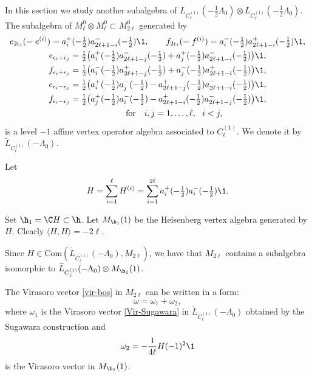 \documentclass[pdftex]{sigma}
\begin{document}
In this section we study another subalgebra of $L_{C_{\ell}
^{(1)}}(-\frac{1}{2}\Lambda_0) \otimes L_{C_{\ell}
^{(1)}}(-\frac{1}{2}\Lambda_0)$. The subalgebra of $M_{\ell} ^0
\otimes M_{\ell} ^0 \subset M_{2 \ell} ^0$ generated by
\begin{gather}
  e_{2 \epsilon _{i}} (=e^{(i)})=a_i ^+ (-\tfrac{1}{2}) a_{2\ell +1-i} ^-( -\tfrac{1}{2})
 {\1}, \qquad   f_{2 \epsilon _{i}}(=f^{(i)})=a_i ^- (-\tfrac{1}{2}) a_{2\ell +1-i} ^+( -\tfrac{1}{2}) {\1},
 \nonumber \\
  e_{\epsilon _{i}+ \epsilon _{j}}=\tfrac{1}{2}\big(a_i ^+
(-\tfrac{1}{2}) a_{2\ell +1-j} ^-( -\tfrac{1}{2}) + a_j ^+
(-\tfrac{1}{2}) a_{2\ell +1-i} ^-( -\tfrac{1}{2})\big){\1}, \nonumber \\
  f_{\epsilon _{i}+ \epsilon _{j}}=\tfrac{1}{2}\big(a_i ^-
(-\tfrac{1}{2}) a_{2\ell +1-j} ^+( -\tfrac{1}{2}) + a_j ^-
(-\tfrac{1}{2}) a_{2\ell +1-i} ^+( -\tfrac{1}{2})\big){\1}, \nonumber \\
  e_{\epsilon _{i}- \epsilon _{j}}=\tfrac{1}{2}\big(a_i ^+
(-\tfrac{1}{2}) a_{j} ^-( -\tfrac{1}{2}) - a_{2\ell +1-j} ^+
(-\tfrac{1}{2}) a_{2\ell +1-i} ^-( -\tfrac{1}{2})\big){\1}, \nonumber \\
  f_{\epsilon _{i}- \epsilon _{j}}=\tfrac{1}{2}\big(a_j ^+
(-\tfrac{1}{2}) a_{i} ^-( -\tfrac{1}{2}) - a_{2\ell +1-i} ^+
(-\tfrac{1}{2}) a_{2\ell +1-j} ^-( -\tfrac{1}{2})\big){\1}, \nonumber
\\
  \hphantom{f_{\epsilon _{i}- \epsilon _{j}}=}{}
    \ \mbox{for}\quad i,j =1, \dots, \ell, \ \ i<j,\label{gen-1-C}
  \end{gather}
is a level $-1$ af\/f\/ine vertex operator algebra associated to
$C_{\ell} ^{(1)}$. We denote it by ${\widetilde L}_{C_{\ell}
^{(1)}}(- \Lambda_0)$.

Let
\[ H = \sum_{i = 1 } ^{\ell} H ^{(i)} =\sum _{i=1}^{2 \ell} a_i ^+
(-\tfrac{1}{2}) a_i ^- (-\tfrac{1}{2}){\1}. \]

Set ${\h}_1 = {\C} H \subset {\h}$. Let $M_{ {\h}_1} (1)$ be the
Heisenberg vertex algebra generated by $H$. Clearly $\langle H, H
\rangle = -2 \ell$.


Since  $H \in \mbox{Com} ({\widetilde L}_{C_{\ell} ^{(1)}}(-
\Lambda_0), M_{2 \ell})$, we have that
  $M_{2 \ell}$ contains a
subalgebra isomorphic to $ {\widetilde L}_{C_{\ell} ^{(1)}}(-
\Lambda_0) \otimes M_{{\h}_1 }(1)$.

\begin{proposition} \label{Vir-decomp-C}
The Virasoro vector \eqref{vir-bos} in $M_{2 \ell}$ can be written
in a form:
\[ \omega = \omega_1 + \omega_2,
\]
where $ \omega_1$ is the  Virasoro vector \eqref{Vir-Sugawara} in
${\widetilde L}_{C_{\ell} ^{(1)}}(- \Lambda_0)$ obtained by the
Sugawara construction and
\[ \omega_2 = -\frac{1}{4 \ell} H(-1) ^{2} {\1}\] is the Virasoro
vector in $M_{ {\h}_1} (1)$.
\end{proposition}
\end{document}
